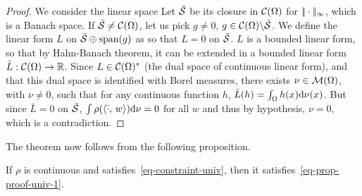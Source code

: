\begin{proof}
	We consider the linear space
	Let $\bar{\mathcal{S}}$ be its closure in $\mathcal{C}(\Omega)$ for $|\!| \cdot |\!|_\infty$, which is a Banach space.
	If $\bar{\mathcal{S}} \neq \mathcal{C}(\Omega)$, let us pick $g \neq 0$, $g \in \mathcal{C}(\Omega) \backslash \bar{\mathcal{S}}$.
	We define the linear form $L$ on $\bar{\mathcal{S}} \oplus \text{span}(g)$ as
	so that $L=0$ on $\bar{\mathcal{S}}$. $L$ is a bounded linear form, so that by Hahn-Banach theorem, it can be extended in a bounded linear form $\bar L : \mathcal{C}(\Omega) \rightarrow \mathbb{R}$. Since $L \in \mathcal{C}(\Omega)^*$ (the dual space of continuous linear form), and that this dual space is identified with Borel measures, there exists $\nu \in \mathcal{M}(\Omega)$, with $\nu \neq 0$, such that for any continuous function $h$, $\bar L(h) = \int_\Omega h(x) \mathrm{d}\nu(x)$.
	But since $\bar L = 0$ on $\bar{\mathcal{S}}$, $\int \rho(\langle \bar \cdot,\,w\rangle) \mathrm{d} \nu = 0$ for all $w$ and thus by hypothesis, $\nu=0$, which is a contradiction.
\end{proof}

The theorem now follows from the following proposition.

\begin{prop}
	If $\rho$ is continuous and satisfies~\eqref{eq-constraint-univ}, then it satisfies~\eqref{eq-prop-proof-univ-1}.
\end{prop}

